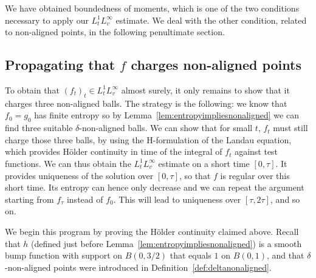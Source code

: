 \documentclass[11pt,a4paper]{article}
\theoremstyle{definition}
\theoremstyle{plain}
\begin{document}
We have obtained boundedness of moments, which is one of the two conditions necessary to apply our $L^1_t L^\infty_v$ estimate. We deal with the other condition, related to non-aligned points, in the following penultimate section.

\subsection{Propagating that $f$ charges non-aligned points}

To obtain that $(f_t)_t\in L^1_t L^\infty_v$ almost surely, it only remains to show that it charges three non-aligned balls. The strategy is the following: we know that $f_0=g_0$ has finite entropy so by Lemma~\ref{lem:entropyimpliesnonaligned} we can find three suitable $\delta$-non-aligned balls. We can show that for small $t$, $f_t$ must still charge those three balls, by using the H-formulation of the Landau equation, which provides Hölder continuity in time of the integral of $f_t$ against test functions. We can thus obtain the $ L^1_t L^\infty_v$ estimate on a short time $[0,\tau]$. It provides uniqueness of the solution over $[0,\tau]$, so that $f$ is regular over this short time. Its entropy can hence only decrease and we can repeat the argument starting from $f_\tau$ instead of $f_0$. This will lead to uniqueness over $[\tau,2\tau]$, and so on.

We begin this program by proving the Hölder continuity claimed above. Recall that $h$ (defined just before Lemma~\ref{lem:entropyimpliesnonaligned}) is a smooth bump function with support on $B(0,3/2)$ that equals $1$ on $B(0,1)$, and that $\delta$-non-aligned points were introduced in Definition~\ref{def:deltanonaligned}.
\end{document}
